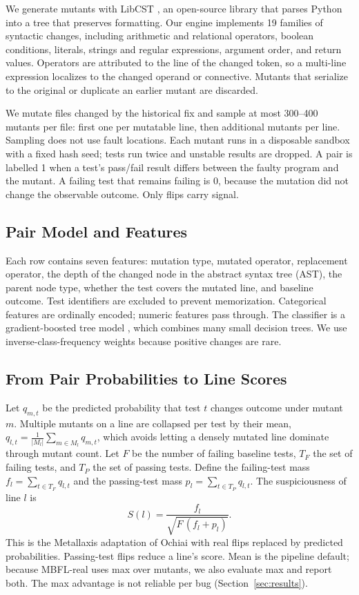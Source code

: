 \documentclass[10pt,conference]{IEEEtran}
\begin{document}
We generate mutants with LibCST \cite{b12}, an open-source library that parses Python into a tree that preserves formatting. Our engine implements 19 families of syntactic changes, including arithmetic and relational operators, boolean conditions, literals, strings and regular expressions, argument order, and return values. Operators are attributed to the line of the changed token, so a multi-line expression localizes to the changed operand or connective. Mutants that serialize to the original or duplicate an earlier mutant are discarded.

We mutate files changed by the historical fix and sample at most 300--400 mutants per file: first one per mutatable line, then additional mutants per line. Sampling does not use fault locations. Each mutant runs in a disposable sandbox with a fixed hash seed; tests run twice and unstable results are dropped. A pair is labelled 1 when a test's pass/fail result differs between the faulty program and the mutant. A failing test that remains failing is 0, because the mutation did not change the observable outcome. Only flips carry signal.

\subsection{Pair Model and Features}

Each row contains seven features: mutation type, mutated operator, replacement operator, the depth of the changed node in the abstract syntax tree (AST), the parent node type, whether the test covers the mutated line, and baseline outcome. Test identifiers are excluded to prevent memorization. Categorical features are ordinally encoded; numeric features pass through. The classifier is a gradient-boosted tree model \cite{b13}, which combines many small decision trees. We use inverse-class-frequency weights because positive changes are rare.

\subsection{From Pair Probabilities to Line Scores}

Let $q_{m,t}$ be the predicted probability that test $t$ changes outcome under mutant $m$. Multiple mutants on a line are collapsed per test by their mean, $q_{l,t}=\frac{1}{|M_l|}\sum_{m\in M_l}q_{m,t}$, which avoids letting a densely mutated line dominate through mutant count. Let $F$ be the number of failing baseline tests, $T_F$ the set of failing tests, and $T_P$ the set of passing tests. Define the failing-test mass $f_l=\sum_{t\in T_F}q_{l,t}$ and the passing-test mass $p_l=\sum_{t\in T_P}q_{l,t}$. The suspiciousness of line $l$ is
\begin{equation}
S(l)=\frac{f_l}{\sqrt{F\,(f_l+p_l)}}.
\label{eq:score}
\end{equation}
This is the Metallaxis adaptation of Ochiai with real flips replaced by predicted probabilities. Passing-test flips reduce a line's score. Mean is the pipeline default; because MBFL-real uses max over mutants, we also evaluate max and report both. The max advantage is not reliable per bug (Section~\ref{sec:results}).
\end{document}
